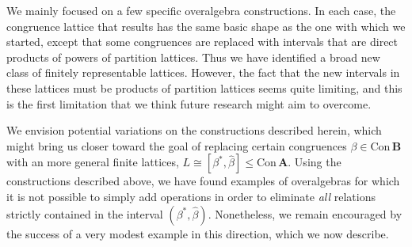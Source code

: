 \documentclass[cm,dissertation,actual,final]{uhthesis}
\theoremstyle{plain}
\theoremstyle{definition}
\theoremstyle{remark}
\numberwithin{theorem}{section}
\numberwithin{claim}{chapter}
\numberwithin{equation}{section}
\numberwithin{conjecture}{chapter}
\newcommand{\<}{\ensuremath{\langle}}
\renewcommand{\>}{\ensuremath{\rangle}}
\renewcommand{\leq}{\ensuremath{\leqslant}}
\newcommand{\Con}{\ensuremath{\mathrm{Con\,}}}
\newcommand{\0}{\ensuremath{\mathbf{0}}}
\newcommand{\1}{\ensuremath{\mathbf{1}}}
\newcommand{\2}{\ensuremath{\mathbf{2}}}
\newcommand{\3}{\ensuremath{\mathbf{3}}}
\newcommand{\4}{\ensuremath{\mathbf{4}}}
\newcommand{\5}{\ensuremath{\mathbf{5}}}
\newcommand{\bA}{\ensuremath{\mathbf{A}}}
\newcommand{\bB}{\ensuremath{\mathbf{B}}}
\begin{document}
  We mainly focused on a few specific overalgebra constructions.
  In each case, the congruence lattice that results has the same basic shape as
  the one with which we started, except that some congruences are replaced with
  intervals that are direct products of powers of partition lattices.  
  Thus we have identified a broad new class of finitely representable lattices.  
  However, the fact that the new intervals in these lattices must be products of
  partition lattices seems quite limiting, and this is the first limitation that we
  think future research might aim to overcome.  

  We envision potential variations on the constructions described herein,
  which might bring us closer toward the goal of replacing certain congruences
  $\beta\in \Con \bB$ with an more general finite lattices,
  $L\cong [\beta^*, \widehat{\beta}] \leq \Con \bA$.
  Using the constructions described above, we have found examples of overalgebras
  for which it is not possible to simply add operations 
  in order to eliminate \emph{all} relations strictly contained in the interval
  $(\beta^*,  \widehat{\beta})$.
  Nonetheless, we remain encouraged by the success of a very modest example
  in this direction, which we now describe.
\end{document}
